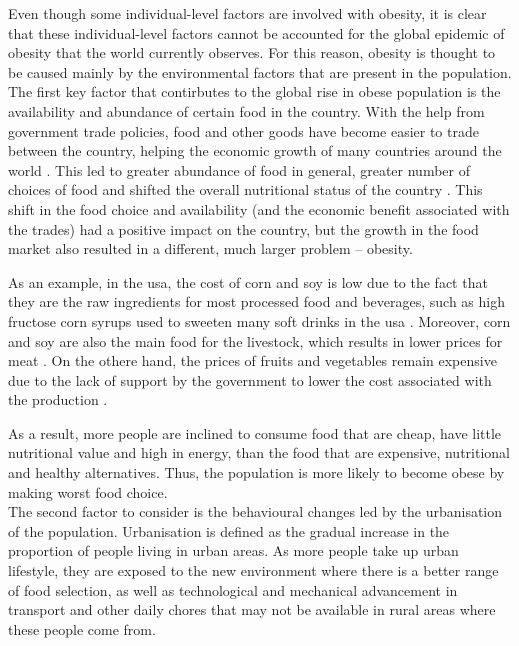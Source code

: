 Even though some individual-level factors are involved with obesity, it is clear that these individual-level factors cannot be accounted for the global epidemic of obesity that the world currently observes.
For this reason, obesity is thought to be caused mainly by the environmental factors that are present in the population.\\

\noindent
The first key factor that contirbutes to the global rise in obese population is the availability and abundance of certain food in the country.
With the help from government trade policies, food and other goods have become easier to trade between the country, helping the economic growth of many countries around the world \citep{Kearney2010}.
This led to greater abundance of food in general, greater number of choices of food and shifted the overall nutritional status of the country \citep{Malik2013}.
This shift in the food choice and availability (and the economic benefit associated with the trades) had a positive impact on the country, but the growth in the food market also resulted in a different, much larger problem -- obesity.

As an example, in the \gls{usa}, the cost of corn and soy is low due to the fact that they are the raw ingredients for most processed food and beverages, such as high fructose corn syrups used to sweeten many soft drinks in the \gls{usa} \citep{Malik2013}.
Moreover, corn and soy are also the main food for the livestock, which results in lower prices for meat \citep{Malik2013}.
On the othere hand, the prices of fruits and vegetables remain expensive due to the lack of support by the government to lower the cost associated with the production \citep{Malik2013}.

As a result, more people are inclined to consume food that are cheap, have little nutritional value and high in energy, than the food that are expensive, nutritional and healthy alternatives.
Thus, the population is more likely to become obese by making worst food choice.\\

\noindent
The second factor to consider is the behavioural changes led by the urbanisation of the population.
Urbanisation is defined as the gradual increase in the proportion of people living in urban areas.
As more people take up urban lifestyle, they are exposed to the new environment where there is a better range of food selection, as well as technological and mechanical advancement in transport and other daily chores that may not be available in rural areas where these people come from.

